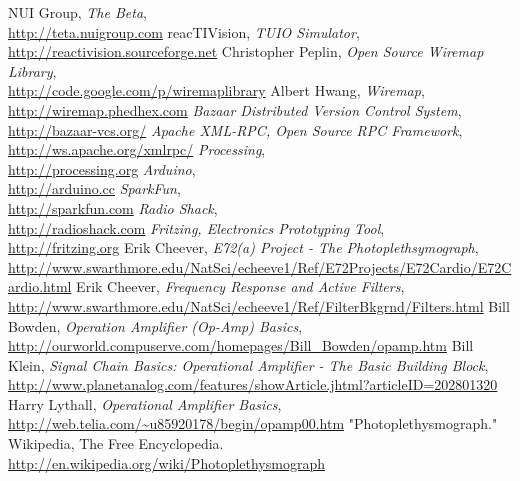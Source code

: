 \begin{thebibliography}{99}%
NUI Group, \textsl{The Beta},
\\ \mbox{}\hfill\url{http://teta.nuigroup.com}
reacTIVision, \textsl{TUIO Simulator},
\\ \mbox{}\hfill\url{http://reactivision.sourceforge.net}
Christopher Peplin, \textsl{Open Source Wiremap Library},
\\ \mbox{}\hfill\url{http://code.google.com/p/wiremaplibrary}
Albert Hwang, \textsl{Wiremap},
\\ \mbox{}\hfill\url{http://wiremap.phedhex.com}
\textsl{Bazaar Distributed Version Control System},
\\ \mbox{}\hfill\url{http://bazaar-vcs.org/}
\textsl{Apache XML-RPC, Open Source RPC Framework},
\\ \mbox{}\hfill\url{http://ws.apache.org/xmlrpc/}
\textsl{Processing}, 
\\ \mbox{}\hfill\url{http://processing.org}
\textsl{Arduino},
\\ \mbox{}\hfill\url{http://arduino.cc}
\textsl{SparkFun},
\\ \mbox{}\hfill\url{http://sparkfun.com}
\textsl{Radio Shack},
\\ \mbox{}\hfill\url{http://radioshack.com}
\textsl{Fritzing, Electronics Prototyping Tool},
\\ \mbox{}\hfill\url{http://fritzing.org}
Erik Cheever, \textsl{E72(a) Project - The Photoplethsymograph},
\\ \mbox{}\hfill\url{http://www.swarthmore.edu/NatSci/echeeve1/Ref/E72Projects/E72Cardio/E72Cardio.html}
Erik Cheever, \textsl{Frequency Response and Active Filters},
\\ \mbox{}\hfill\url{http://www.swarthmore.edu/NatSci/echeeve1/Ref/FilterBkgrnd/Filters.html}
Bill Bowden, \textsl{Operation Amplifier (Op-Amp) Basics},
\\ \mbox{}\hfill\url{http://ourworld.compuserve.com/homepages/Bill\_Bowden/opamp.htm}
Bill Klein, \textsl{Signal Chain Basics: Operational Amplifier - The Basic Building Block},
\\ \mbox{}\hfill\url{http://www.planetanalog.com/features/showArticle.jhtml?articleID=202801320}
Harry Lythall, \textsl{Operational Amplifier Basics},
\\ \mbox{}\hfill\url{http://web.telia.com/~u85920178/begin/opamp00.htm}
"Photoplethysmograph." Wikipedia, The Free Encyclopedia.
\\ \mbox{}\hfill\url{http://en.wikipedia.org/wiki/Photoplethysmograph}
\end{thebibliography}
